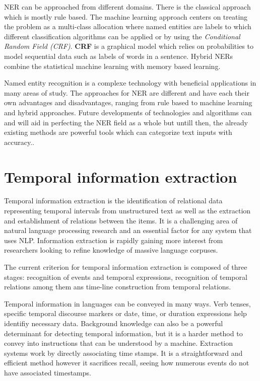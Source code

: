 \documentclass{report}
\begin{document}
NER can be approached from different domains. There is the classical approach which is mostly rule based. The machine learning approach centers on treating the problem as a multi-class allocation where named entities are labels to which different classification algorithms can be applied or by using the \textit{Conditional Random Field (CRF)}. \textbf{CRF} is a graphical model which relies on probabilities to model sequential data such as labels of words in a sentence.  Hybrid NERs combine the statistical machine learning with memory based learning. \par

Named entity recognition is a complexe technology with beneficial applications in many areas of study. The approaches for NER are different and have each their own advantages and disadvantages, ranging from rule based to machine learning and hybrid approaches. Future developments of technologies and algorithms can and will aid in perfecting the NER field as a whole but untill then, the already existing methods are powerful tools which can categorize text inputs with accuracy..

\section{Temporal information extraction}
Temporal information extraction is the identification of relational data representing temporal intervals from unstructured text as well as the extraction and establishment of relations between the items. It is a challenging area of natural language processing research and an essential factor for any system that uses NLP. Information extraction is rapidly gaining more interest from researchers looking to refine knowledge of massive language corpuses.\par

The current criterion for temporal information extraction is composed of three stages: recognition of events and temporal expressions, recognition of temporal relations among them ans time-line construction from temporal relations. \par

Temporal information in languages can be conveyed in many ways. Verb tenses, specific temporal discourse markers or date, time, or duration expressions help identifiy necessary data. Background knowledge can also be a powerful determinant for detecting temporal information, but it is a harder method to convey into instructions that can be understood by a machine. Extraction systems work by directly associating time stamps. It is a straightforward and efficient method however it sacrifices recall, seeing how numerous events do not have associated timestamps.
\end{document}
